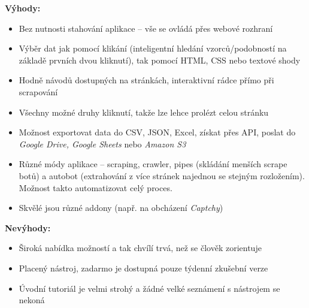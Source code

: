 \documentclass[thesis=B,czech]{FITthesis}[2012/06/26]
\begin{document}
\textbf{Výhody:}
\begin{itemize}
	\item Bez nutnosti stahování aplikace -- vše se ovládá přes webové rozhraní
	\item Výběr dat jak pomocí klikání (inteligentní hledání vzorců/podobností na základě prvních dvou kliknutí), tak pomocí HTML, CSS nebo textové shody
	\item Hodně návodů dostupných na stránkách, interaktivní rádce přímo při scrapování
	\item Všechny možné druhy kliknutí, takže lze lehce prolézt celou stránku
	\item Možnost exportovat data do CSV, JSON, Excel, získat přes API, poslat do \emph{Google Drive, Google Sheets} nebo \emph{Amazon S3}
	\item Různé módy aplikace -- scraping, crawler, pipes (skládání menších scrape botů) a autobot (extrahování z více stránek najednou se stejným rozložením). Možnost takto automatizovat celý proces.
	\item Skvělé jsou různé addony (např. na obcházení \emph{Captchy})
\end{itemize}

\textbf{Nevýhody:}
\begin{itemize}
	\item Široká nabídka možností a tak chvílí trvá, než se člověk zorientuje
	\item Placený nástroj, zadarmo je dostupná pouze týdenní zkušební verze
	\item Úvodní tutoriál je velmi strohý a žádné velké seznámení s nástrojem se nekoná
\end{itemize}


\newpage
\end{document}
